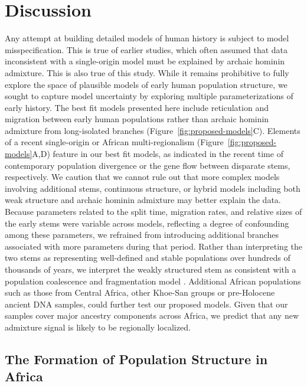 \documentclass[]{article}
\begin{document}
\section*{Discussion}

Any attempt at building detailed models of human history is subject to model
misspecification. This is true of earlier studies, which often assumed that
data inconsistent with a single-origin model must be explained by archaic
hominin admixture. This is also true of this study. While it remains
prohibitive to fully explore the space of plausible models of early human
population structure, we sought to capture model uncertainty by exploring
multiple parameterizations of early history. The best fit models presented
here include reticulation and migration between early human populations rather
than archaic hominin admixture from long-isolated branches
(Figure~\ref{fig:proposed-models}C). 
Elements of a recent single-origin or African multi-regionalism
(Figure~\ref{fig:proposed-models}A,D)
feature in our best fit models, as indicated in the recent time of
contemporary population divergence
or the gene flow between disparate stems, respectively.
We caution that we cannot rule out that more complex models involving
additional stems, continuous structure, or
hybrid models including both weak structure and archaic hominin admixture may
better explain the data. Because parameters related to the split time,
migration rates, and relative sizes of the early stems were variable across
models, reflecting a degree of confounding among these parameters, we refrained
from introducing additional branches associated with more parameters during
that period.  Rather than interpreting the two stems as representing
well-defined and stable populations over hundreds of thousands of years, we
interpret the weakly structured stem as consistent with a population
coalescence and fragmentation model \citep{Scerri2019-xg}.
Additional African populations such as those 
from Central Africa, other Khoe-San groups or pre-Holocene ancient DNA samples,
could further test our proposed models.
Given that our samples cover major ancestry components across Africa, we predict
that any new admixture signal is likely to be regionally localized.

\subsection*{The Formation of Population Structure in Africa}
\end{document}
